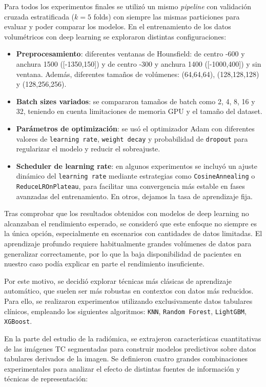 Para todos los experimentos finales se utilizó un mismo \textit{pipeline} con validación cruzada estratificada (\( k=5 \) folds) con siempre las mismas particiones para evaluar y poder comparar los modelos. En el entrenamiento de los datos volumétricos con deep learning se exploraron distintas configuraciones:

\begin{itemize}
    \item \textbf{Preprocesamiento}: diferentes ventanas de Hounsfield: de centro -600 y anchura 1500 ([-1350,150]) y de centro -300 y anchura 1400 ([-1000,400]) y sin ventana. Además, diferentes tamaños de volúmenes: (64,64,64), (128,128,128) y (128,256,256).
    \item \textbf{Batch sizes variados}: se compararon tamaños de batch como 2, 4, 8, 16 y 32, teniendo en cuenta limitaciones de memoria GPU y el tamaño del dataset.
    \item \textbf{Parámetros de optimización}: se usó el optimizador Adam con diferentes valores de \texttt{learning rate}, \texttt{weight decay} y probabilidad de \texttt{dropout} para regularizar el modelo y reducir el sobreajuste.
    \item \textbf{Scheduler de learning rate}: en algunos experimentos se incluyó un ajuste dinámico del \texttt{learning rate} mediante estrategias como \texttt{CosineAnnealing} o \texttt{ReduceLROnPlateau}, para facilitar una convergencia más estable en fases avanzadas del entrenamiento. En otros, dejamos la tasa de aprendizaje fija. 
\end{itemize}
  
Tras comprobar que los resultados obtenidos con modelos de deep learning no alcanzaban el rendimiento esperado, se consideró que este enfoque no siempre es la única opción, especialmente en escenarios con cantidades de datos limitadas. El aprendizaje profundo requiere habitualmente grandes volúmenes de datos para generalizar correctamente, por lo que la baja disponibilidad de pacientes en nuestro caso podía explicar en parte el rendimiento insuficiente.  

Por este motivo, se decidió explorar técnicas más clásicas de aprendizaje automático, que suelen ser más robustas en contextos con datos más reducidos. Para ello, se realizaron experimentos utilizando exclusivamente datos tabulares clínicos, empleando los siguientes algoritmos: \texttt{KNN}, \texttt{Random Forest}, \texttt{LightGBM}, \texttt{XGBoost}.  


En la parte del estudio de la radiómica, se extrajeron características cuantitativas de las imágenes TC segmentadas para construir modelos predictivos sobre datos tabulares derivados de la imagen. Se definieron cuatro grandes combinaciones experimentales para analizar el efecto de distintas fuentes de información y técnicas de representación:

